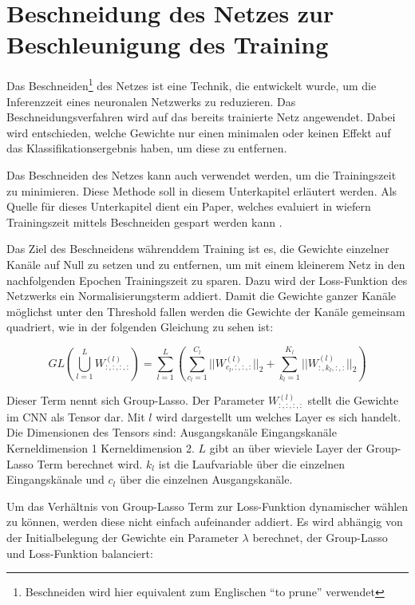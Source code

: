 \section{Beschneidung des Netzes zur Beschleunigung des Training}
Das Beschneiden\footnote{Beschneiden wird hier equivalent zum Englischen  "`to prune"' verwendet} des Netzes ist eine Technik, die entwickelt wurde, um die Inferenzzeit eines neuronalen Netzwerks zu reduzieren. Das Beschneidungsverfahren wird auf das bereits trainierte Netz angewendet. Dabei wird entschieden, welche Gewichte nur einen minimalen oder keinen Effekt auf das Klassifikationsergebnis haben, um diese zu entfernen.

Das Beschneiden des Netzes kann auch verwendet werden, um die Trainingszeit zu minimieren. Diese Methode soll in diesem Unterkapitel erläutert werden. Als Quelle für dieses Unterkapitel dient ein Paper, welches evaluiert in wiefern Trainingszeit mittels Beschneiden gespart werden kann \cite{prunetrain}.


Das Ziel des Beschneidens währenddem Training ist es, die Gewichte einzelner Kanäle auf Null zu setzen und zu entfernen, um mit einem kleinerem Netz in den nachfolgenden Epochen Trainingszeit zu sparen. Dazu wird der Loss-Funktion des Netzwerks ein Normalisierungsterm addiert. Damit die Gewichte ganzer Kanäle möglichst unter den Threshold fallen werden die Gewichte der Kanäle gemeinsam quadriert, wie in der folgenden Gleichung zu sehen ist:

\begin{equation}
GL(\bigcup_{l=1}^{L} W_{:,:,:,:}^{(l)})=\sum_{l=1}^{L} \left( \sum_{c_l=1}^{C_l} || W_{c_l,:,:,:}^{(l)} ||_2 + \sum_{k_l=1}^{K_l} || W_{:,k_l,:,:}^{(l)}||_2 \right)
 \label{equ:PTloss}
\end{equation}

Dieser Term nennt sich Group-Lasso. Der Parameter $W_{:,:,:,:}^{(l)}$ stellt die Gewichte im CNN als Tensor dar. Mit $l$ wird dargestellt um welches Layer es sich handelt. Die Dimensionen des Tensors sind: Ausgangskanäle \texttimes Eingangskanäle \texttimes Kerneldimension 1 \texttimes Kerneldimension 2. $L$ gibt an über wieviele Layer der Group-Lasso Term berechnet wird. $k_l$ ist die Laufvariable über die einzelnen Eingangskänale und $c_l$ über die einzelnen Ausgangskanäle.

Um das Verhältnis von Group-Lasso Term zur Loss-Funktion dynamischer wählen zu können, werden diese nicht einfach aufeinander addiert. Es wird abhängig von der Initialbelegung der Gewichte ein Parameter $\lambda$  berechnet, der Group-Lasso und Loss-Funktion balanciert:


